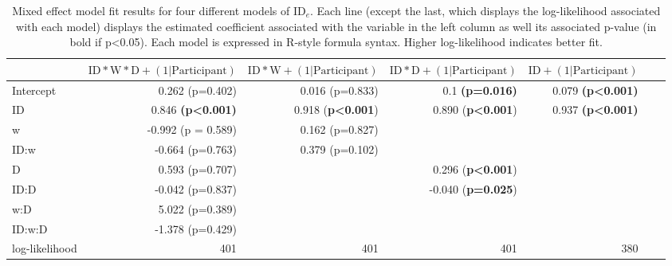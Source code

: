 \documentclass[acmlarge, manuscript,review]{acmart}
\newcommand{\ide}{\ensuremath{{\text{ID}_e}}\xspace}
\newcommand{\D}{\ensuremath{{\text{D}}}\xspace}
\newcommand{\W}{\ensuremath{{\text{W}}}\xspace}
\begin{document}
\begin{table}
	\caption{Mixed effect model fit results for four different models of \ide. Each line (except the last, which displays the log-likelihood associated with each model) displays the estimated coefficient associated with the variable in the left column as well its associated p-value (in bold if p<0.05). Each model is expressed in R-style formula syntax. Higher log-likelihood indicates better fit.}
	\label{tab:fit_jgp_ide_id}
\begin{center}
	\begin{tabular}{lrrrrrr}
	\hline
		  &  $\text{ID}*\W*\D + (1|\text{Participant})$ & $\text{ID}*\W + (1|\text{Participant})$ & $\text{ID}*\D + (1 | \text{Participant})$ & $\text{ID}+ (1 | \text{Participant})$  \\
	\hline
	Intercept &  0.262 (p=0.402) &    				0.016 (p=0.833) &  0.1 \textbf{(p=0.016)} & 0.079 \textbf{(p\textless0.001)} \\
	ID        &  0.846 \textbf{(p\textless0.001)} &    0.918 (\textbf{p\textless0.001}) &  0.890 (\textbf{p\textless0.001}) & 0.937 \textbf{(p\textless0.001)}  \\
	w         & -0.992 (p = 0.589) & 0.162 (p=0.827)    &   & \\
	ID:w      & -0.664 (p=0.763) &    0.379 (p=0.102)  &   & \\
	D         &  0.593 (p=0.707) &    &  0.296 (\textbf{p\textless0.001})  & \\
	ID:D      & -0.042 (p=0.837) &     & -0.040 (\textbf{p=0.025})  & \\
	w:D       &  5.022 (p=0.389) &     &  &   \\
	ID:w:D    & -1.378 (p=0.429) &     &   & \\
	log-likelihood & 401 & 401 & 401  & 380\\
	\hline
	\end{tabular}
	\end{center}
	\end{table}


\end{document}
